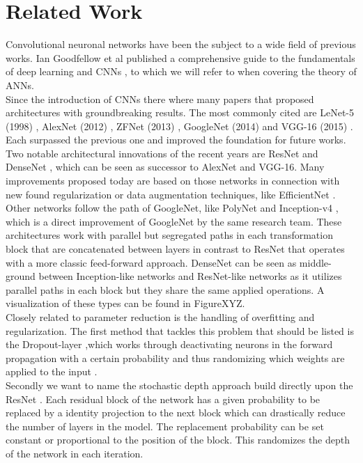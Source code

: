 \documentclass[a4paper,12pt,titlepage,enabledeprecatedfontcommands]{scrreprt}
\begin{document}
\chapter{Related Work}
Convolutional neuronal networks have been the subject to a wide field of previous works. Ian Goodfellow et al published a comprehensive guide to the fundamentals of deep learning and CNNs \cite{Goodfellow-et-al-2016}, to which we will refer to when covering the theory of ANNs. \\
Since the introduction of CNNs there where many papers that proposed architectures with groundbreaking results. The most commonly cited are LeNet-5 (1998) \cite{LeNet}, AlexNet (2012) \cite{AlexNet}, ZFNet (2013) \cite{zeiler2013visualizing}, GoogleNet (2014)\cite{szegedy2014going} and VGG-16 (2015) \cite{simonyan2015deep}. Each surpassed the previous one and improved the foundation for future works.\\ Two notable architectural innovations of the recent years are ResNet \cite{DBLP:journals/corr/HeZRS15} and DenseNet \cite{DBLP:journals/corr/HuangLW16a}, which can be seen as successor to AlexNet and VGG-16. Many improvements proposed today are based on those networks in connection with new found regularization or data augmentation techniques, like EfficientNet \cite{DBLP:journals/corr/abs-1905-11946}. Other networks follow the path of GoogleNet, like PolyNet \cite{DBLP:journals/corr/ZhangLLL16} and Inception-v4 \cite{DBLP:journals/corr/SzegedyIV16}, which is a direct improvement of GoogleNet by the same research team. These architectures work with parallel but segregated paths in each transformation block that are concatenated between layers in contrast to ResNet that operates with a more classic feed-forward approach. DenseNet can be seen as middle-ground between Inception-like networks and ResNet-like networks as it utilizes parallel paths in each block but they share the same applied operations. A visualization of these types can be found in FigureXYZ. \\
Closely related to parameter reduction is the handling of overfitting and regularization. The first method that tackles this problem that should be listed is the Dropout-layer ,which works through deactivating neurons in the forward propagation with a certain probability and thus randomizing which weights are applied to the input \cite{JMLR:v15:srivastava14a}. \\
Secondly we want to name the stochastic depth approach build directly upon the ResNet \cite{DBLP:journals/corr/HuangSLSW16}. Each residual block of the network has a given probability to be replaced by a identity projection to the next block which can drastically reduce the number of layers in the model. The replacement probability can be set constant or proportional to the position of the block. This randomizes the depth of the network in each iteration.
\end{document}
